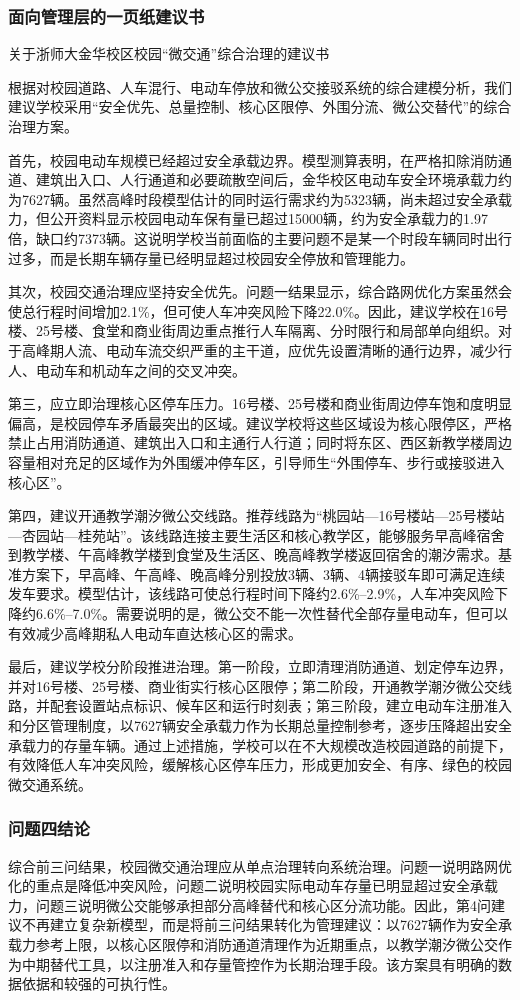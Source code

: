 \documentclass[UTF8,zihao=-4,a4paper]{ctexart}
\begin{document}
\subsubsection{面向管理层的一页纸建议书}

\begin{center}
{\heiti 关于浙师大金华校区校园“微交通”综合治理的建议书}
\end{center}

根据对校园道路、人车混行、电动车停放和微公交接驳系统的综合建模分析，我们建议学校采用“安全优先、总量控制、核心区限停、外围分流、微公交替代”的综合治理方案。

首先，校园电动车规模已经超过安全承载边界。模型测算表明，在严格扣除消防通道、建筑出入口、人行通道和必要疏散空间后，金华校区电动车安全环境承载力约为7627辆。虽然高峰时段模型估计的同时运行需求约为5323辆，尚未超过安全承载力，但公开资料显示校园电动车保有量已超过15000辆，约为安全承载力的1.97倍，缺口约7373辆。这说明学校当前面临的主要问题不是某一个时段车辆同时出行过多，而是长期车辆存量已经明显超过校园安全停放和管理能力。

其次，校园交通治理应坚持安全优先。问题一结果显示，综合路网优化方案虽然会使总行程时间增加2.1\%，但可使人车冲突风险下降22.0\%。因此，建议学校在16号楼、25号楼、食堂和商业街周边重点推行人车隔离、分时限行和局部单向组织。对于高峰期人流、电动车流交织严重的主干道，应优先设置清晰的通行边界，减少行人、电动车和机动车之间的交叉冲突。

第三，应立即治理核心区停车压力。16号楼、25号楼和商业街周边停车饱和度明显偏高，是校园停车矛盾最突出的区域。建议学校将这些区域设为核心限停区，严格禁止占用消防通道、建筑出入口和主通行人行道；同时将东区、西区新教学楼周边容量相对充足的区域作为外围缓冲停车区，引导师生“外围停车、步行或接驳进入核心区”。

第四，建议开通教学潮汐微公交线路。推荐线路为“桃园站—16号楼站—25号楼站—杏园站—桂苑站”。该线路连接主要生活区和核心教学区，能够服务早高峰宿舍到教学楼、午高峰教学楼到食堂及生活区、晚高峰教学楼返回宿舍的潮汐需求。基准方案下，早高峰、午高峰、晚高峰分别投放3辆、3辆、4辆接驳车即可满足连续发车要求。模型估计，该线路可使总行程时间下降约2.6\%--2.9\%，人车冲突风险下降约6.6\%--7.0\%。需要说明的是，微公交不能一次性替代全部存量电动车，但可以有效减少高峰期私人电动车直达核心区的需求。

最后，建议学校分阶段推进治理。第一阶段，立即清理消防通道、划定停车边界，并对16号楼、25号楼、商业街实行核心区限停；第二阶段，开通教学潮汐微公交线路，并配套设置站点标识、候车区和运行时刻表；第三阶段，建立电动车注册准入和分区管理制度，以7627辆安全承载力作为长期总量控制参考，逐步压降超出安全承载力的存量车辆。通过上述措施，学校可以在不大规模改造校园道路的前提下，有效降低人车冲突风险，缓解核心区停车压力，形成更加安全、有序、绿色的校园微交通系统。

\subsubsection{问题四结论}

综合前三问结果，校园微交通治理应从单点治理转向系统治理。问题一说明路网优化的重点是降低冲突风险，问题二说明校园实际电动车存量已明显超过安全承载力，问题三说明微公交能够承担部分高峰替代和核心区分流功能。因此，第4问建议不再建立复杂新模型，而是将前三问结果转化为管理建议：以7627辆作为安全承载力参考上限，以核心区限停和消防通道清理作为近期重点，以教学潮汐微公交作为中期替代工具，以注册准入和存量管控作为长期治理手段。该方案具有明确的数据依据和较强的可执行性。
\end{document}
